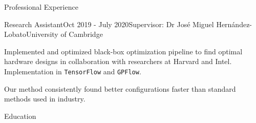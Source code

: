 \documentclass{resume} %
\begin{document}
\begin{rSection}{Professional Experience}
\begin{rSubsection}{Research Assistant}{Oct 2019 - July 2020}{Supervisor: Dr Jos\'e Miguel Hern\'andez-Lobato}{University of Cambridge}
\item Implemented and optimized black-box optimization pipeline to find optimal
  hardware designs in collaboration with researchers at Harvard and Intel.
  Implementation in \texttt{TensorFlow} and \texttt{GPFlow}.
\item Our method consistently found better configurations faster than standard
  methods used in industry.
\end{rSubsection}

\end{rSection}


\begin{rSection}{Education}



\end{rSection}

\end{document}
